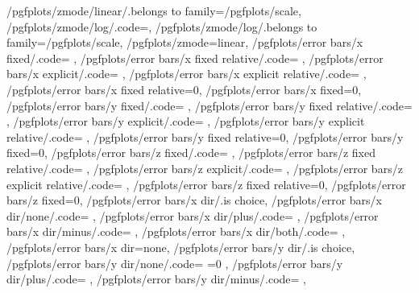 {	/pgfplots/zmode/linear/.belongs to family=/pgfplots/scale,
	/pgfplots/zmode/log/.code={\pgfplots@zislinearfalse},
	/pgfplots/zmode/log/.belongs to family=/pgfplots/scale,
	/pgfplots/zmode=linear,
	/pgfplots/error bars/x fixed/.code=				\def\pgfplots@errorbars@xfixed{#1}\def\pgfplots@errorbars@xmode{0},
	/pgfplots/error bars/x fixed relative/.code=		\def\pgfplots@errorbars@xrel{#1}\def\pgfplots@errorbars@xmode{1},
	/pgfplots/error bars/x explicit/.code=			\def\pgfplots@errorbars@xmode{2},
	/pgfplots/error bars/x explicit relative/.code=	\def\pgfplots@errorbars@xmode{3},
	/pgfplots/error bars/x fixed relative=0,
	/pgfplots/error bars/x fixed=0,
	/pgfplots/error bars/y fixed/.code=				\def\pgfplots@errorbars@yfixed{#1}\def\pgfplots@errorbars@ymode{0},
	/pgfplots/error bars/y fixed relative/.code=		\def\pgfplots@errorbars@yrel{#1}\def\pgfplots@errorbars@ymode{1},
	/pgfplots/error bars/y explicit/.code=			\def\pgfplots@errorbars@ymode{2},
	/pgfplots/error bars/y explicit relative/.code=	\def\pgfplots@errorbars@ymode{3},
	/pgfplots/error bars/y fixed relative=0,
	/pgfplots/error bars/y fixed=0,
	/pgfplots/error bars/z fixed/.code=				\def\pgfplots@errorbars@zfixed{#1}\def\pgfplots@errorbars@zmode{0},
	/pgfplots/error bars/z fixed relative/.code=		\def\pgfplots@errorbars@zrel{#1}\def\pgfplots@errorbars@zmode{1},
	/pgfplots/error bars/z explicit/.code=			\def\pgfplots@errorbars@zmode{2},
	/pgfplots/error bars/z explicit relative/.code=	\def\pgfplots@errorbars@zmode{3},
	/pgfplots/error bars/z fixed relative=0,
	/pgfplots/error bars/z fixed=0,
	/pgfplots/error bars/x dir/.is choice,
	/pgfplots/error bars/x dir/none/.code={%
		\def\pgfplots@errorbars@xdirection{0}%
		\ifnum{}
			\ifnum{}
				\pgfplots@errorbars@enabledfalse
			\fi
		\fi
	},
	/pgfplots/error bars/x dir/plus/.code=				\def\pgfplots@errorbars@xdirection{1}\pgfplots@errorbars@enabledtrue,
	/pgfplots/error bars/x dir/minus/.code=				\def\pgfplots@errorbars@xdirection{2}\pgfplots@errorbars@enabledtrue,
	/pgfplots/error bars/x dir/both/.code=				\def\pgfplots@errorbars@xdirection{3}\pgfplots@errorbars@enabledtrue,
	/pgfplots/error bars/x dir=none,
	/pgfplots/error bars/y dir/.is choice,
	/pgfplots/error bars/y dir/none/.code={%
		\def\pgfplots@errorbars@ydirection{0}%
		\ifnum\pgfplots@errorbars@xdirection=0
			\ifnum{}
				\pgfplots@errorbars@enabledfalse
			\fi
		\fi
	},
	/pgfplots/error bars/y dir/plus/.code=				\def\pgfplots@errorbars@ydirection{1}\pgfplots@errorbars@enabledtrue,
	/pgfplots/error bars/y dir/minus/.code=				\def\pgfplots@errorbars@ydirection{2}\pgfplots@errorbars@enabledtrue,
}
